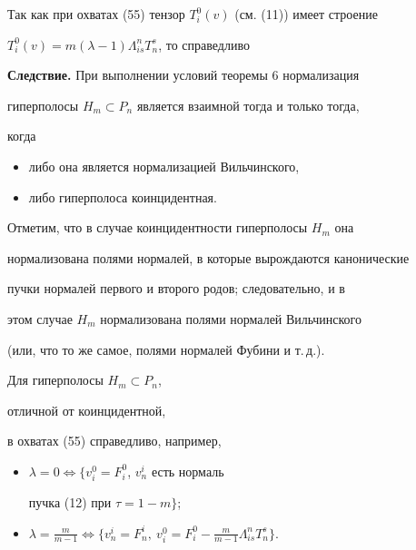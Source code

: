 Так как при охватах (55) тензор $T^0_i(v)$ (см. (11)) имеет строение 


$T^0_i(v)=m(\lambda-1)\Lambda^n_{is}T^s_n$, то справедливо 


\medskip 


 


{\bf Следствие.} При выполнении условий теоремы 6 нормализация 


гиперполосы $H_m\subset P_n$ является взаимной тогда и только тогда,  


когда 


\begin{itemize} 


\item[---] либо она является нормализацией Вильчинского,  


\item[---] либо гиперполоса коинцидентная. 


\end{itemize} 


 


Отметим, что в случае коинцидентности гиперполосы $H_m$ она  


нормализована полями нормалей, в которые вырождаются канонические 


пучки нормалей первого и второго родов; следовательно, и в  


этом случае $H_m$ нормализована полями нормалей Вильчинского  


(или, что то же самое, полями нормалей Фубини и т.\,д.).  


 


\begin{note} Для гиперполосы $H_m\subset P_n$, 


отличной от коинцидентной, 


в охватах (55) справедливо, например,


\begin{itemize} 


\item[---] $\lambda=0\Leftrightarrow\{v^0_i=F^0_i$, $v^i_n$ есть нормаль 


пучка (12) при $\tau=1-m\}$; 


\item[---] $\lambda=\frac{m}{m-1}\Leftrightarrow\{v^i_n=F^i_n,\ 


v^0_i=F^0_i-\frac{m}{m-1}\Lambda^n_{is}T^s_n\}$. 


\end{itemize} 


\end{note} 


